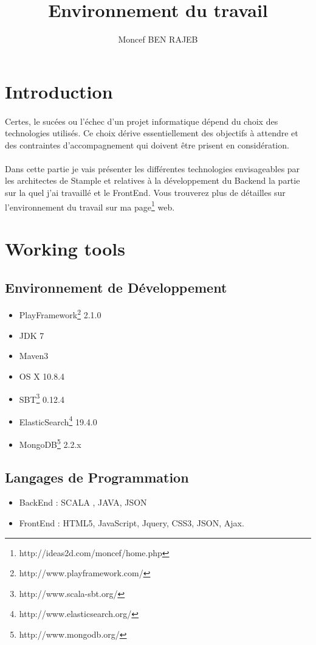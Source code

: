 \documentclass[11pt]{article} %
\title{Environnement du travail}
\author{Moncef BEN RAJEB}
\begin{document}
\maketitle
\section{Introduction}
\paragraph{}
Certes, le sucées ou l'échec d'un projet informatique dépend du choix des technologies utilisés.
Ce choix dérive essentiellement des objectifs à attendre et des contraintes d'accompagnement qui doivent être prisent en considération.
\paragraph{}
Dans cette partie je vais présenter les différentes technologies envisageables par les architectes de Stample 
et relatives à la développement du Backend la partie sur la quel j'ai travaillé et le FrontEnd.
Vous trouverez plus de détailles sur l'environnement du travail sur ma page\footnote{http://ideas2d.com/moncef/home.php} web.
\section{Working tools}
\subsection{Environnement de Développement}
\begin{itemize}
\item PlayFramework\footnote{http://www.playframework.com/} 2.1.0
\item JDK 7
\item Maven3
\item OS X 10.8.4
\item SBT\footnote{http://www.scala-sbt.org/} 0.12.4
\item ElasticSearch\footnote{http://www.elasticsearch.org/} 19.4.0
\item MongoDB\footnote{http://www.mongodb.org/} 2.2.x

\end{itemize}

\subsection{Langages de Programmation}
\begin{itemize}

\item BackEnd : SCALA , JAVA, JSON
\item FrontEnd : HTML5, JavaScript, Jquery, CSS3, JSON, Ajax. 

\end{itemize}
\end{document}
